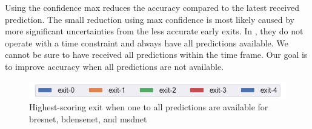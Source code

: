Using the confidence max reduces the accuracy compared to the latest received prediction. The small reduction using max confidence is most likely caused by more significant uncertainties from the less accurate early exits. In \cite{kaya_shallow-deep_nodate}, they do not operate with a time constraint and always have all predictions available. We cannot be sure to have received all predictions within the time frame. Our goal is to improve accuracy when all predictions are not available. 
\begin{figure}
	\captionsetup[subfigure]{justification=centering}
	\centering
	\includegraphics[width=.7\linewidth]{figures/edge/exit0-4_legend}
	\hfill
	\hfill
	\caption[Highest Scoring Exit]{Highest-scoring exit when one to all predictions are available for \protect{} \gls{bresnet}, \protect{} \gls{bdensenet}, and \protect{} \gls{msdnet} }
	\label{fig:exit-highscore}
\end{figure}

